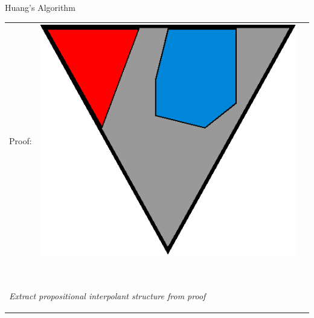 \documentclass[final,compress]{beamer}
\begin{document}
\subsection{}
\begin{frame}{Huang's Algorithm}
	\small
	
	\begin{tabular}{p{}ll}

		Proof: 
		&

		\multicolumn{1}{m{\fakemulticolwidth}}{
			\includegraphics[width=\proofwidth]{figures/two_phase_draft_proof}
		}
		&
		\vspace*{0.2em}
		\\

		\multicolumn{2}{l}{
			\proofindent{\stagearrow} ~\parbox[c]{14em}{\raggedright \emph{ Extract propositional interpolant structure from proof}}
			\vspace*{0.2em}
		}
		\\


\end{tabular}
\end{frame}
\end{document}

